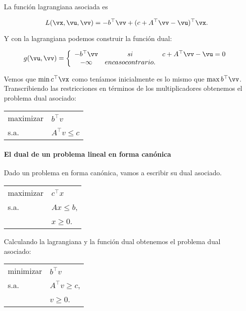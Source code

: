 La función lagrangiana asociada es

\[
L(\vx,\vu,\vv) = -b^\top \vv + (c+A^\top \vv -\vu)^\top \vx.
\]

Y con la lagrangiana podemos construir la función dual:

\[
	g(\vu,\vv)=
		\left\{
			\begin{array}{ccc} 
				-b^\top \vv & si & c+A^\top \vv -\vu=0\\
				-\infty & en caso contrario.&
			\end{array}
		\right.
	\]


Vemos que $\min c^\top \vx$ como teníamos inicialmente es lo mismo que $\max{b^\top \vv}$.
%
Transcribiendo las restricciones en términos de los multiplicadores obtenemos el problema dual asociado:

\begin{center}
\begin{tabular}{ll}
maximizar & $b^\top v$  \\
s.a. & $A^\top v \leq c$       
\end{tabular}
\end{center}

\paragraph{El dual de un problema lineal en forma canónica}

Dado un problema en forma canónica, vamos a escribir su dual asociado.

\begin{center}
\begin{tabular}{ll}
maximizar & $c^\top x$  \\
s.a. & $Ax\leq b$,     \\
	 & $x\geq 0$.  
\end{tabular}
\end{center}

Calculando la lagrangiana y la función dual obtenemos el problema dual asociado:

\begin{center}
\begin{tabular}{ll}
minimizar & $b^\top v$  \\
s.a. & $A^\top v \geq c$,     \\
	 & $v\geq 0$.  
\end{tabular}
\end{center}

